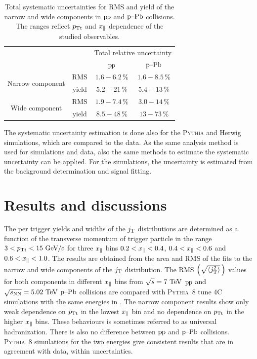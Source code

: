 \begin{table}
  \caption{Total systematic uncertainties for RMS and yield of the narrow and wide components in $\mbox{p\kern-0.05em p}$ and $\mbox{p--Pb}$ collisions. The ranges reflect $p_{\rm Tt}$ and $x_{\parallel}$ dependence of the studied observables.}
  \begin{center}
    \begin{tabular}{cccc}
      \toprule
                                             &       &\multicolumn{2}{c}{Total relative uncertainty} \\
                                             &       &      $\mbox{p\kern-0.05em p}$        &      $\mbox{p--Pb}$        \\
                                             \hline
        \multirow{ 2}{*}{Narrow component}   &  RMS  &  $1.6 - 6.2\,\%$  &   $1.6 - 8.5\,\%$  \\
                                             & yield &  $5.2 - 21\,\%$   &   $5.4 - 13\,\%$   \\
        \multirow{ 2}{*}{Wide component}     &  RMS  &  $1.9 - 7.4\,\%$  &   $3.0 - 14\,\%$   \\
                                             & yield &  $8.5 - 48\,\%$   &   $13  - 73\,\%$   \\
        \bottomrule
    \end{tabular}
  \end{center}
  \label{tab:uncertainties}
\end{table} 

The systematic uncertainty estimation is done also for the \textsc{Pythia} and Herwig simulations, which are compared to the data. As the same analysis method is used for simulations and data, also the same methods to estimate the systematic uncertainty can be applied. For the simulations, the uncertainty is estimated from the background determination and signal fitting.

\section{Results and discussions}
\label{sec:results}

The per trigger yields and widths of the $j_{\rm T}$ distributions are determined as a function of the transverse momentum of trigger particle in the range $3 < p_{\rm Tt} < 15~\mathrm{GeV}\kern-0.05em/\kern-0.02em c$ for three $x_{\parallel}$ bins $0.2 < x_{\parallel} < 0.4$, $0.4 < x_{\parallel} < 0.6$ and $0.6 < x_{\parallel} < 1.0$. The results are obtained from the area and RMS of the fits to the narrow and wide components of the $j_{\rm T}$ distribution. The RMS $\left(\sqrt{\left<j_{\rm T}^2\right>}\,\right)$ values for both components in different $x_{\parallel}$ bins from $\sqrt{s} = 7~\mathrm{TeV}$ $\mbox{p\kern-0.05em p}$ and $\sqrt{s_{\mathrm{NN}}} = 5.02~\mathrm{TeV}$ $\mbox{p--Pb}$ collisions are compared with \textsc{Pythia}~8 tune 4C~\cite{pythia4CTune} simulations with the same energies in . The narrow component results show only weak dependence on $p_{\rm Tt}$ in the lowest $x_{\parallel}$ bin and no dependence on $p_{\rm Tt}$ in the higher $x_{\parallel}$ bins. These behaviours is sometimes referred to as universal hadronization. There is also no difference between $\mbox{p\kern-0.05em p}$ and $\mbox{p--Pb}$ collisions. \textsc{Pythia}~8 simulations for the two energies give consistent results that are in agreement with data, within uncertainties.

